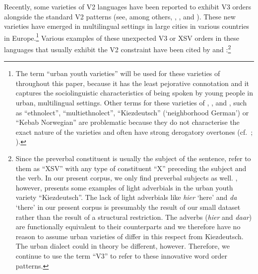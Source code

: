 \documentclass[output=paper]{langsci/langscibook}
\begin{document}
\noindent Recently, some varieties of  V2 languages have been reported
to exhibit V3 orders alongside the standard V2 patterns (see, among others,
\citealt{Freywaldetal:2015}, \citealt{Wiese:2013}, \citealt{WieseRehbein:2016}
and \citealt{Walkden:2017}). These new  varieties have emerged in
multilingual settings in large cities in various countries in
Europe.\footnote{The term \enquote{urban youth varieties} will be used for
    these varieties of  throughout this paper, because it has the least
    pejorative connotation and it captures the sociolinguistic characteristics
    of being spoken by young people in urban, multilingual settings. Other
    terms for these varieties of , , 
    and , such as
    \enquote{ethnolect}, \enquote{multiethnolect}, \enquote{Kiezdeutsch} (`neighborhood German') or
    \enquote{Kebab Norwegian} are problematic because they do not characterise the
    exact nature of the varieties and often have strong derogatory overtones
    (cf.\ \citealt{Walkden:2017}; \citealt{Aarsaether:2010}).} Various examples
    of these unexpected V3 or XSV orders in these languages that usually exhibit the V2 constraint have been
cited by \citet{Freywaldetal:2015} and \citet{Walkden:2017}:\footnote{Since the preverbal constituent is
        usually the subject of the sentence, \citet{Freywaldetal:2015} refer to
        them as \enquote{XSV} with any type of constituent \enquote{X}
        preceding the subject and the verb. In our present corpus, we only find
        preverbal subjects as well.  \citet{Walkden:2017}, however, presents
        some examples of light adverbials in the  urban youth variety
        \enquote{Kiezdeutsch}. The lack of light adverbials like \emph{hier} `here' and
        \emph{da} `there' in our present corpus is presumably the result of our
        small dataset rather than the result of a structural restriction. The
         adverbs (\emph{hier} and \emph{daar}) are functionally equivalent
        to their  counterparts and we therefore have no reason to assume
    urban varieties of  differ in this respect from Kiezdeutsch. The 
urban dialect could in theory be different, however. Therefore, we continue to
use the term \enquote{V3} to refer to these innovative word order patterns.}
\end{document}
